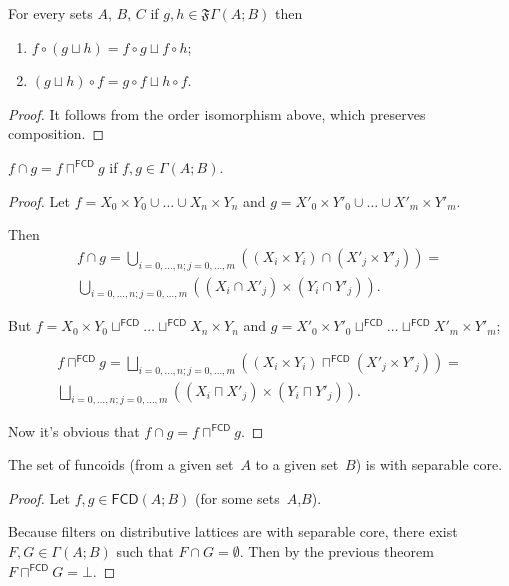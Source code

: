 \begin{thm}
For every sets $A$, $B$, $C$ if $g,h\in\mathfrak{F}\Gamma(A;B)$
then
\begin{enumerate}
\item $f\circ(g\sqcup h)=f\circ g\sqcup f\circ h$;
\item $(g\sqcup h)\circ f=g\circ f\sqcup h\circ f$.
\end{enumerate}
\end{thm}
\begin{proof}
It follows from the order isomorphism above, which preserves composition.\end{proof}
\begin{thm}
$f\cap g=f\sqcap^{\mathsf{FCD}}g$ if $f,g\in\Gamma(A;B)$.\end{thm}
\begin{proof}
Let $f=X_{0}\times Y_{0}\cup\ldots\cup X_{n}\times Y_{n}$ and $g=X'_{0}\times Y'_{0}\cup\ldots\cup X'_{m}\times Y'_{m}$.

Then 
\begin{multline*}
f\cap g=\bigcup_{i=0,\ldots,n;j=0,\ldots,m}((X_{i}\times Y_{i})\cap(X'_{j}\times Y'_{j}))=\\
\bigcup_{i=0,\ldots,n;j=0,\ldots,m}((X_{i}\cap X'_{j})\times(Y_{i}\cap Y'_{j})).
\end{multline*}


But $f=X_{0}\times Y_{0}\sqcup^{\mathsf{FCD}}\ldots\sqcup^{\mathsf{FCD}}X_{n}\times Y_{n}$
and $g=X'_{0}\times Y'_{0}\sqcup^{\mathsf{FCD}}\ldots\sqcup^{\mathsf{FCD}}X'_{m}\times Y'_{m}$;

\begin{multline*}
f\sqcap^{\mathsf{FCD}}g=\bigsqcup_{i=0,\ldots,n;j=0,\ldots,m}((X_{i}\times Y_{i})\sqcap^{\mathsf{FCD}}(X'_{j}\times Y'_{j}))=\\
\bigsqcup_{i=0,\ldots,n;j=0,\ldots,m}((X_{i}\sqcap X'_{j})\times(Y_{i}\sqcap Y'_{j})).
\end{multline*}


Now it's obvious that $f\cap g=f\sqcap^{\mathsf{FCD}}g$.\end{proof}
\begin{thm}
The set of funcoids (from a given set~$A$ to a given set~$B$)
is with separable core.\end{thm}
\begin{proof}
Let $f,g\in\mathsf{FCD}(A;B)$ (for some sets~$A$,$B$).

Because filters on distributive lattices are with separable core,
there exist $F,G\in\Gamma(A;B)$ such that $F\cap G=\emptyset$. Then
by the previous theorem $F\sqcap^{\mathsf{FCD}}G=\bot$.\end{proof}
